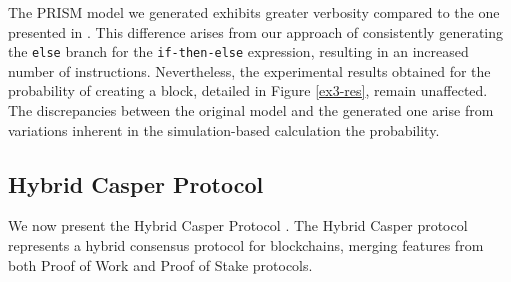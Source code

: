 The PRISM model we generated exhibits greater verbosity compared to the one presented in \cite{DBLP:journals/concurrency/BistarelliNGLMV23}. This difference arises from our approach of consistently generating the \texttt{else} branch for the \texttt{if-then-else} expression, resulting in an increased number of instructions.
Nevertheless, the experimental results obtained for the probability of creating a block, detailed in Figure \ref{ex3-res}, remain unaffected. The discrepancies between the original model and the generated one arise from variations inherent in the simulation-based calculation the probability.


\subsection{Hybrid Casper Protocol}
\begin{comment}
\begin{wrapfigure}[12]{l}{4.5cm}
	\texttt{[image: ethereum.pdf]}	
\end{wrapfigure} 
\end{comment}
We now present the Hybrid Casper Protocol \cite{DBLP:journals/distribledger/GallettaLMV23}. The Hybrid Casper protocol represents a hybrid consensus protocol for blockchains, merging features from both Proof of Work and Proof of Stake protocols. 

